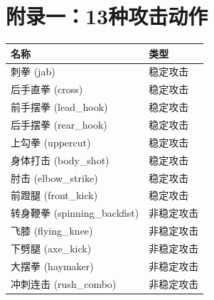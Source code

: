 \appendix
\section{附录一：13种攻击动作}
\begin{longtable}{ll}
\toprule
名称 & 类型 \\
\midrule
刺拳 (jab) & 稳定攻击 \\
后手直拳 (cross) & 稳定攻击 \\
前手摆拳 (lead\_hook) & 稳定攻击 \\
后手摆拳 (rear\_hook) & 稳定攻击 \\
上勾拳 (uppercut) & 稳定攻击 \\
身体打击 (body\_shot) & 稳定攻击 \\
肘击 (elbow\_strike) & 稳定攻击 \\
前蹬腿 (front\_kick) & 稳定攻击 \\
转身鞭拳 (spinning\_backfist) & 非稳定攻击 \\
飞膝 (flying\_knee) & 非稳定攻击 \\
下劈腿 (axe\_kick) & 非稳定攻击 \\
大摆拳 (haymaker) & 非稳定攻击 \\
冲刺连击 (rush\_combo) & 非稳定攻击 \\
\bottomrule
\end{longtable}

